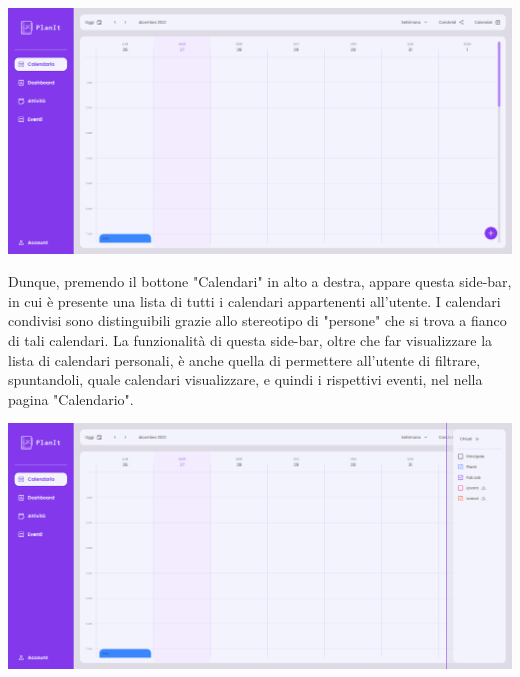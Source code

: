 \begin{center}
    \includegraphics[width=1\textwidth, height=0.3\textheight]{img/png/FrontEnd/Calendario/schermata_calendario.png}
\end{center}

Dunque, premendo il bottone "Calendari" in alto a destra, appare questa side-bar, in cui è presente una lista di tutti i calendari appartenenti all'utente. I calendari condivisi sono distinguibili grazie allo stereotipo di "persone" che si trova a fianco di tali calendari. La funzionalità di questa side-bar, oltre che far visualizzare la lista di calendari personali, è anche quella di permettere all'utente di filtrare, spuntandoli, quale calendari visualizzare, e quindi i rispettivi eventi, nel nella pagina "Calendario".

\begin{center}
    \includegraphics[width=1\textwidth, height=0.3\textheight]{img/png/FrontEnd/Calendario/calendario_calendari.png}
\end{center}

